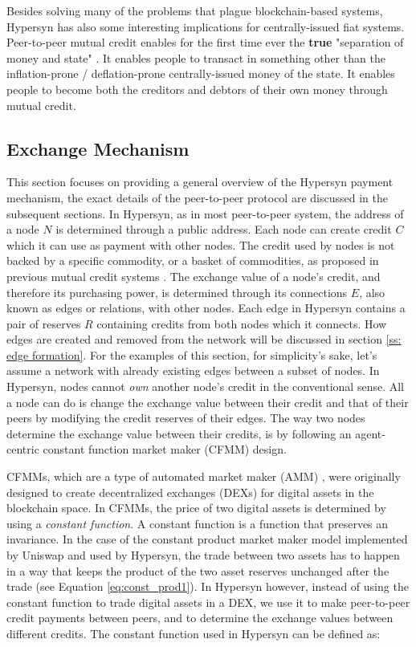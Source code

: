 \documentclass{article}
\begin{document}
Besides solving many of the problems that plague blockchain-based systems, Hypersyn has also some interesting implications for centrally-issued fiat systems. Peer-to-peer mutual credit enables for the first time ever the \textbf{true} "separation of money and state" \cite{riegel_new_1976}. It enables people to transact in something other than the inflation-prone / deflation-prone centrally-issued money of the state. It enables people to become both the creditors and debtors of their own money through mutual credit. 


\subsection{Exchange Mechanism}
\label{ss: exchange mechanism}
This section focuses on providing a general overview of the Hypersyn payment mechanism, the exact details of the peer-to-peer protocol are discussed in the subsequent sections. In Hypersyn, as in most peer-to-peer system, the address of a node $N$ is determined through a public address. Each node can create credit $C$ which it can use as payment with other nodes. The credit used by nodes is not backed by a specific commodity, or a basket of commodities, as proposed in previous mutual credit systems \cite{greco_end_2009}. The exchange value of a node's credit, and therefore its purchasing power, is determined through its connections $E$, also known as edges or relations, with other nodes. Each edge in Hypersyn contains a pair of reserves $R$ containing credits from both nodes which it connects. How edges are created and removed from the network will be discussed in section \ref{ss: edge formation}. For the examples of this section, for simplicity's sake, let's assume a network with already existing edges between a subset of nodes. In Hypersyn, nodes cannot \textit{own} another node's credit in the conventional sense. All a node can do is change the exchange value between their credit and that of their peers by modifying the credit reserves of their edges. The way two nodes determine the exchange value between their credits, is by following an agent-centric constant function market maker (CFMM) design. 

CFMMs, which are a type of automated market maker (AMM) \cite{othman_automated_2012}, were originally designed to create decentralized exchanges (DEXs) for digital assets in the blockchain space. In CFMMs, the price of two digital assets is determined by using a \textit{constant function}. A constant function is a function that preserves an invariance. In the case of the constant product market maker model implemented by Uniswap \cite{zhang_formal_2018} and used by Hypersyn, the trade between two assets has to happen in a way that keeps the product of the two asset reserves unchanged after the trade (see Equation \ref{eq:const_prod1}). In Hypersyn however, instead of using the constant function to trade digital assets in a DEX, we use it to make peer-to-peer credit payments between peers, and to determine the exchange values between different credits. The constant function used in Hypersyn can be defined as:
\end{document}
